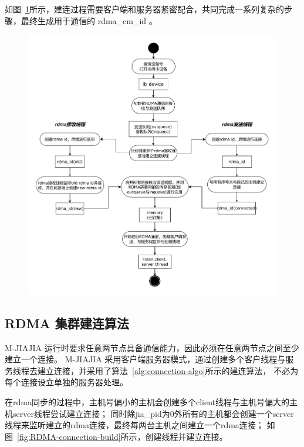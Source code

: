 {    如图~\ref{fig:mjiajia-cm-connection}所示，建连过程需要客户端和服务器紧密配合，共同完成一系列复杂的步骤，最终生成用于通信的 rdma\_cm\_id 。

    \begin{figure}[H]
        \centering
        \includegraphics[width=\textwidth]{Img/rdma_init.drawio.pdf}
        \label{fig:mjiajia-cm-connection}
    \end{figure}

    \subsection{RDMA 集群建连算法}

    M-JIAJIA 运行时要求任意两节点具备通信能力，因此必须在任意两节点之间至少建立一个连接。
    M-JIAJIA 采用客户端服务器模式，通过创建多个客户线程与服务线程去建立连接，并采用了算法~\ref{alg:connection-algo}所示的建连算法，
    不必为每个连接设立单独的服务器处理。

    在rdma同步的过程中，主机号偏小的主机会创建多个client线程与主机号偏大的主机server线程尝试建立连接；
    同时除jia\_pid为0外所有的主机都会创建一个server线程来监听建立的rdma连接，最终每两台主机之间建立一个rdma连接；
    如图~\ref{fig:RDMA-connection-build}所示，创建线程并建立连接。

}
